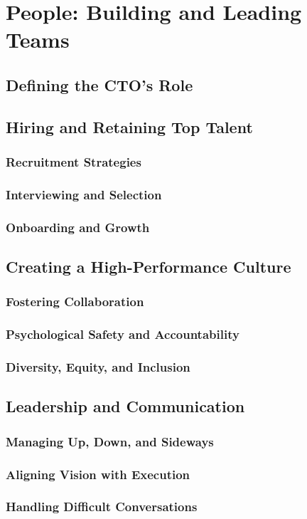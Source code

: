 \chapter{People: Building and Leading Teams}
\section{Defining the CTO's Role}
\section{Hiring and Retaining Top Talent}
\subsection{Recruitment Strategies}
\subsection{Interviewing and Selection}
\subsection{Onboarding and Growth}
\section{Creating a High-Performance Culture}
\subsection{Fostering Collaboration}
\subsection{Psychological Safety and Accountability}
\subsection{Diversity, Equity, and Inclusion}
\section{Leadership and Communication}
\subsection{Managing Up, Down, and Sideways}
\subsection{Aligning Vision with Execution}
\subsection{Handling Difficult Conversations}